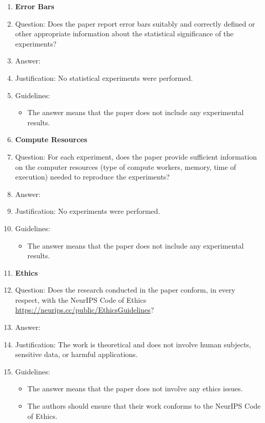 \begin{enumerate}
\item {\bf Error Bars}
    \item[] Question: Does the paper report error bars suitably and correctly defined or other appropriate information about the statistical significance of the experiments?
    \item[] Answer: \answerNA{}
    \item[] Justification: No statistical experiments were performed.
    \item[] Guidelines:
    \begin{itemize}
        \item The answer \answerNA{} means that the paper does not include any experimental results.
    \end{itemize}

\item {\bf Compute Resources}
    \item[] Question: For each experiment, does the paper provide sufficient information on the computer resources (type of compute workers, memory, time of execution) needed to reproduce the experiments?
    \item[] Answer: \answerNA{}
    \item[] Justification: No experiments were performed.
    \item[] Guidelines:
    \begin{itemize}
        \item The answer \answerNA{} means that the paper does not include any experimental results.
    \end{itemize}

\item {\bf Ethics}
    \item[] Question: Does the research conducted in the paper conform, in every respect, with the NeurIPS Code of Ethics \url{https://neurips.cc/public/EthicsGuidelines}?
    \item[] Answer: \answerYes{}
    \item[] Justification: The work is theoretical and does not involve human subjects, sensitive data, or harmful applications.
    \item[] Guidelines:
    \begin{itemize}
        \item The answer \answerNA{} means that the paper does not involve any ethics issues.
        \item The authors should ensure that their work conforms to the NeurIPS Code of Ethics. 
    \end{itemize}


\end{enumerate}
